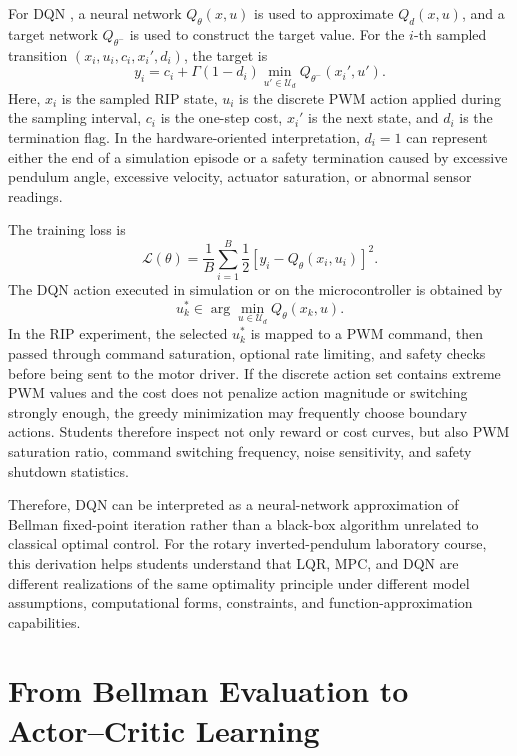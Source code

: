 \documentclass[11pt]{article}
\begin{document}
For DQN \cite{mnih2015human}, a neural network $Q_{\theta}(x,u)$ is used to approximate $Q_d(x,u)$, and a target network $Q_{\theta^-}$ is used to construct the target value. For the $i$-th sampled transition $(x_i,u_i,c_i,x_i',d_i)$, the target is
\begin{equation}
y_i
=c_i+\Gamma(1-d_i)
\min_{u'\in\mathcal{U}_d}Q_{\theta^-}(x_i',u').
\label{eq:DQN_target}
\end{equation}
Here, $x_i$ is the sampled RIP state, $u_i$ is the discrete PWM action applied during the sampling interval, $c_i$ is the one-step cost, $x_i'$ is the next state, and $d_i$ is the termination flag. In the hardware-oriented interpretation, $d_i=1$ can represent either the end of a simulation episode or a safety termination caused by excessive pendulum angle, excessive velocity, actuator saturation, or abnormal sensor readings.

The training loss is
\begin{equation}
\mathcal{L}(\theta)
=
\frac{1}{B}\sum_{i=1}^{B}
\frac{1}{2}
\left[y_i-Q_{\theta}(x_i,u_i)\right]^2.
\label{eq:DQN_loss}
\end{equation}
The DQN action executed in simulation or on the microcontroller is obtained by
\begin{equation}
u_k^{*}\in
\arg\min_{u\in\mathcal{U}_d}Q_{\theta}(x_k,u).
\label{eq:DQN_action}
\end{equation}
In the RIP experiment, the selected $u_k^{*}$ is mapped to a PWM command, then passed through command saturation, optional rate limiting, and safety checks before being sent to the motor driver. If the discrete action set contains extreme PWM values and the cost does not penalize action magnitude or switching strongly enough, the greedy minimization may frequently choose boundary actions. Students therefore inspect not only reward or cost curves, but also PWM saturation ratio, command switching frequency, noise sensitivity, and safety shutdown statistics.

Therefore, DQN can be interpreted as a neural-network approximation of Bellman fixed-point iteration rather than a black-box algorithm unrelated to classical optimal control. For the rotary inverted-pendulum laboratory course, this derivation helps students understand that LQR, MPC, and DQN are different realizations of the same optimality principle under different model assumptions, computational forms, constraints, and function-approximation capabilities.


\section{From Bellman Evaluation to Actor--Critic Learning}
\end{document}
